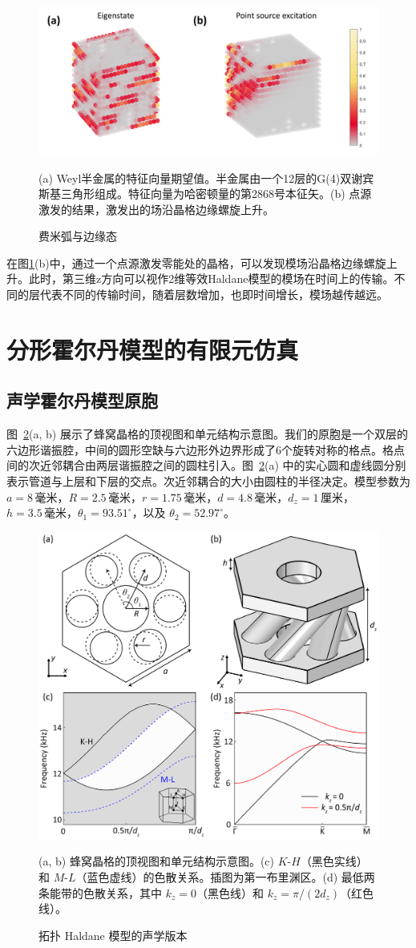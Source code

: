 \begin{figure}[htbp]
    \centering
    \includegraphics[width=0.75\linewidth]{figure/FracHaldExp/3DFermiArc.png}
    \caption{费米弧与边缘态}(a) Weyl半金属的特征向量期望值。半金属由一个12层的G(4)双谢宾斯基三角形组成。特征向量为哈密顿量的第2868号本征矢。(b) 点源激发的结果，激发出的场沿晶格边缘螺旋上升。
    \label{fig:3DFermiArc}
\end{figure}

在图\ref{fig:3DFermiArc}(b)中，通过一个点源激发零能处的晶格，可以发现模场沿晶格边缘螺旋上升。此时，第三维z方向可以视作2维等效Haldane模型的模场在时间上的传输。不同的层代表不同的传输时间，随着层数增加，也即时间增长，模场越传越远。

\section{分形霍尔丹模型的有限元仿真}
\subsection{声学霍尔丹模型原胞}
图~\ref{fig:AcousticUnitCell}(a, b) 展示了蜂窝晶格的顶视图和单元结构示意图。我们的原胞是一个双层的六边形谐振腔，中间的圆形空缺与六边形外边界形成了6个旋转对称的格点。格点间的次近邻耦合由两层谐振腔之间的圆柱引入。图~\ref{fig:AcousticUnitCell}(a) 中的实心圆和虚线圆分别表示管道与上层和下层的交点。次近邻耦合的大小由圆柱的半径决定。模型参数为 $a = 8\,\text{毫米}$，$R = 2.5\,\text{毫米}$，$r = 1.75\,\text{毫米}$，$d = 4.8\,\text{毫米}$，$d_z = 1\,\text{厘米}$，$h = 3.5\,\text{毫米}$，$\theta_1 = 93.51^\circ$，以及 $\theta_2 = 52.97^\circ$。

\begin{figure}[htbp]
    \centering
    \includegraphics[width=0.5\linewidth]{figure/FracHaldExp/AcousticUnitCell.png}
    \caption{拓扑 Haldane 模型的声学版本}(a, b) 蜂窝晶格的顶视图和单元结构示意图。(c) $K$-$H$（黑色实线）和 $M$-$L$（蓝色虚线）的色散关系。插图为第一布里渊区。(d) 最低两条能带的色散关系，其中 $k_z = 0$（黑色线）和 $k_z = \pi/(2d_z)$（红色线）。
    \label{fig:AcousticUnitCell}
\end{figure}

